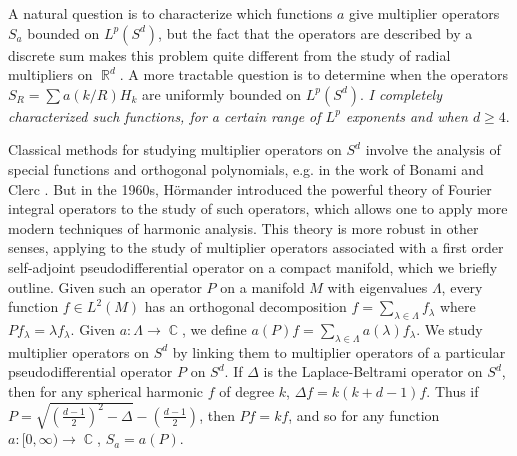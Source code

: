 \documentclass[11pt]{article}
\DeclareMathOperator{\RR}{\mathbb{R}}
\DeclareMathOperator{\CC}{\mathbb{C}}
\begin{document}
A natural question is to characterize which functions $a$ give multiplier operators $S_a$ bounded on $L^p(S^d)$, but the fact that the operators are described by a discrete sum makes this problem quite different from the study of radial multipliers on $\RR^d$. A more tractable question is to determine when the operators $S_R = \sum a(k/R) H_k$ are uniformly bounded on $L^p(S^d)$. \emph{I completely characterized such functions, for a certain range of $L^p$ exponents and when $d \geq 4$}.




Classical methods for studying multiplier operators on $S^d$ involve the analysis of special functions and orthogonal polynomials, e.g. in the work of Bonami and Clerc \cite{BonamiClerc}. But in the 1960s, H\"{o}rmander introduced the powerful theory of Fourier integral operators to the study of such operators, which allows one to apply more modern techniques of harmonic analysis. This theory is more robust in other senses, applying to the study of multiplier operators associated with a first order self-adjoint pseudodifferential operator on a compact manifold, which we briefly outline. Given such an operator $P$ on a manifold $M$ with eigenvalues $\Lambda$, every function $f \in L^2(M)$ has an orthogonal decomposition $f = \sum_{\lambda \in \Lambda} f_\lambda$ where $Pf_\lambda = \lambda f_\lambda$. Given $a: \Lambda \to \CC$, we define $a(P) f = \sum\nolimits_{\lambda \in \Lambda} a(\lambda) f_\lambda$.  We study multiplier operators on $S^d$ by linking them to multiplier operators of a particular pseudodifferential operator $P$ on $S^d$. If $\Delta$ is the Laplace-Beltrami operator on $S^d$, then for any spherical harmonic $f$ of degree $k$, $\Delta f = k(k+d-1) f$. Thus if $P = \sqrt{ ( {\scriptstyle \frac{d-1}{2} } )^2 - \Delta } - \left( {\scriptstyle \frac{d-1}{2}} \right)$, then $Pf = kf$, and so for any function $a: [0,\infty) \to \CC$, $S_a = a(P)$.
\end{document}
